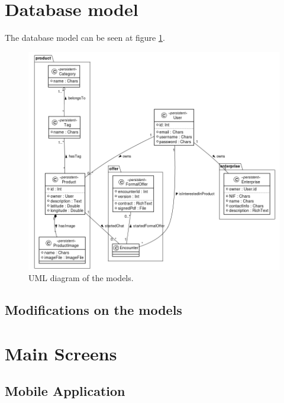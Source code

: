 \documentclass[./main.tex]{subfiles}
\begin{document}
\section{Database model}
The database model can be seen at figure \ref{fig:model-uml}.

\begin{figure}[H]
\centering
\includegraphics[width=\linewidth]{img/database-model.png}
\caption{UML diagram of the models.}
\label{fig:model-uml}
\end{figure}

\subsection{Modifications on the models}

\section{Main Screens} \label{sec:views}

\subsection{Mobile Application}

\end{document}
